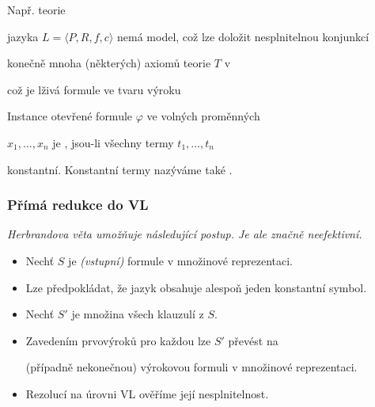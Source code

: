     { Např. teorie}
    \vspace{-1mm}
    
    \vspace{-5mm}
    { jazyka $L=\langle P,R,f,c \rangle$ nemá model, což lze doložit nesplnitelnou konjunkcí
    \smallskip
    
    konečně mnoha  (některých) axiomů teorie $T$ v }
    \vspace{-1mm}
    
    \vspace{-5mm}
    { což je lživá formule ve tvaru výroku}
    \vspace{-1mm}
    
    \vspace{-2mm}
    Instance  otevřené formule $\varphi$ ve volných proměnných
    \smallskip
    
    $x_1,\dots,x_n$ je , jsou-li všechny termy $t_1,\dots,t_n$
    \smallskip
    
    konstantní. Konstantní termy nazýváme také .
    
    


\subsubsection*{Přímá redukce do VL}
    
    {\it Herbrandova věta umožňuje následující postup. Je ale značně neefektivní.}
    \smallskip
    
    \begin{itemize}
    \item Nechť $S$ je \emph{(vstupní)} formule v množinové reprezentaci.
    \smallskip
    
    \item Lze předpokládat, že jazyk obsahuje alespoň jeden konstantní symbol.
    \smallskip
    
    \item Nechť $S'$ je množina všech  klauzulí z $S$.
    \smallskip
    
    \item Zavedením prvovýroků pro každou  lze $S'$ převést na
    \smallskip
    
    (případně nekonečnou) výrokovou formuli v množinové reprezentaci.
    \smallskip
    
    \item Rezolucí na úrovni VL ověříme její nesplnitelnost.
    \end{itemize}
    \medskip
    
